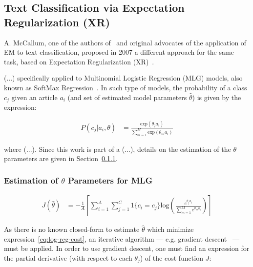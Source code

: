 \subsection{Text Classification via Expectation Regularization (XR)}

A. McCallum, one of the authors of~\cite{Nigam2000,Nigam2010} and original 
advocates of the application of EM to text classification, proposed in 2007 a 
different approach for the same task, based on Expectation Regularization 
(XR)~\cite{Mann2007a}.\vertbreak

(...) specifically applied to Multinomial Logistic Regression (MLG) models, also 
known as SoftMax Regression~\cite{}. In such type of models, the probability of 
a class $c_j$ given an article $a_i$ (and set of estimated model parameters 
$\hat{\theta}$) is given by the expression:

\begin{equation}
\begin{split}
    P(c_j|a_i,\theta) &= \frac{\text{exp}\left(\theta_j a_i\right)}{\sum_{m=1}^{M}\text{exp}\left(\theta_m a_i\right)}
    \label{eq:posterior-log-reg}
\end{split}
\end{equation}

where (...). Since this work is part of a (...), details on the estimation 
of the $\theta$ parameters are given in Section~\ref{subsubsec:log-reg-params}. 

\subsubsection{Estimation of $\theta$ Parameters for MLG}
\label{subsubsec:log-reg-params}

\footnotesize
\begin{equation}
\begin{split}
    J(\hat{\theta}) &= -\frac{1}{A}\left[\sum_{i=1}^{A}\sum_{j=1}^{C}1\{c_{i} = c_{j}\}\text{log}\left(\frac{e^{\theta_j a_i}}{\sum_{m=1}^{M}e^{\theta_m a_i}}\right)\right]
    \label{eq:log-reg-cost}
\end{split}
\end{equation}
\normalsize

As there is no known closed-form to estimate $\hat{\theta}$ which minimize 
expression~\ref{eq:log-reg-cost}, an iterative algorithm --- e.g. gradient 
descent~\cite{} --- must be applied. In order to use gradient descent, one must 
find an expression for the partial derivative (with respect to each $\theta_j$) 
of the cost function $J$:

